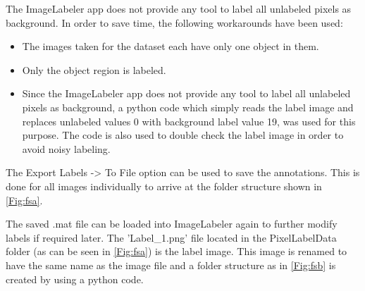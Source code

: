 The ImageLabeler app does not provide any tool to label all unlabeled pixels as background. In order to save time, the following workarounds have been used:
	\begin{itemize}
		\item The images taken for the dataset each have only one object in them.
		\item Only the object region is labeled.
		\item Since the ImageLabeler app does not provide any tool to label all unlabeled pixels as background, a python code which simply reads the label image and replaces unlabeled values 0 with background label value 19, was used for this purpose. The code is also used to double check the label image in order to avoid noisy labeling.
	\end{itemize}
	
The Export Labels -> To File option can be used to save the annotations. This is done for all images individually to arrive at the folder structure shown in \ref{Fig:fsa}.
	
The saved .mat file can be loaded into ImageLabeler again to further modify labels if required later. The 'Label\_1.png' file located in the PixelLabelData folder (as can be seen in \ref{Fig:fsa}) is the label image. This image is renamed to have the same name as the image file and a folder structure as in \ref{Fig:fsb} is created by using a python code.
	
